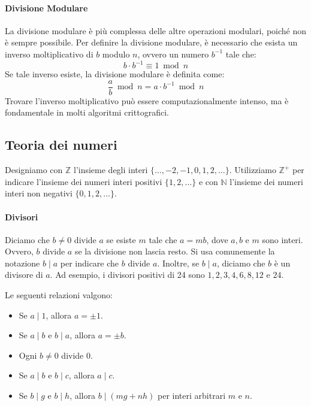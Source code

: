 \documentclass{article}
\theoremstyle{definition}
\begin{document}
\paragraph{Divisione Modulare}
La divisione modulare è più complessa delle altre operazioni modulari, poiché non è sempre possibile. Per definire la divisione modulare, è necessario che esista un inverso moltiplicativo di $b$ modulo $n$, ovvero un numero $b^{-1}$ tale che:
\begin{equation*}
    b \cdot b^{-1} \equiv 1 \bmod n
\end{equation*}
Se tale inverso esiste, la divisione modulare è definita come:
\begin{equation*}
    \frac{a}{b}  \bmod n = a \cdot b^{-1} \bmod n
\end{equation*}
Trovare l'inverso moltiplicativo può essere computazionalmente intenso, ma è fondamentale in molti algoritmi crittografici.

\subsection{Teoria dei numeri}
Designiamo con \( \mathbb{Z} \) l'insieme degli interi \( \{ \ldots, -2, -1, 0, 1, 2, \ldots \} \). Utilizziamo \( \mathbb{Z}^+ \) per indicare l'insieme dei numeri interi positivi \( \{ 1, 2, \ldots \} \) e con \( \mathbb{N} \) l'insieme dei numeri interi non negativi \( \{ 0, 1, 2, \ldots \} \).

\paragraph{Divisori}Diciamo che \( b \neq 0 \) divide \( a \) se esiste \( m \) tale che \( a = mb \), dove \( a, b \) e \( m \) sono interi. Ovvero, \( b \) divide \( a \) se la divisione non lascia resto. Si usa comunemente la notazione \( b \mid a \) per indicare che \( b \) divide \( a \). Inoltre, se \( b \mid a \), diciamo che \( b \) è un divisore di \( a \). Ad esempio, i divisori positivi di 24 sono \( 1, 2, 3, 4, 6, 8, 12 \) e \( 24 \).

Le seguenti relazioni valgono:
\begin{itemize}
\item Se \( a \mid 1 \), allora \( a = \pm 1 \).
\item Se \( a \mid b \) e \( b \mid a \), allora \( a = \pm b \).
\item Ogni \( b \neq 0 \) divide \( 0 \).
\item Se \( a \mid b \) e \( b \mid c \), allora \( a \mid c \).
\item Se \( b \mid g \) e \( b \mid h \), allora \( b \mid (mg + nh) \) per interi arbitrari \( m \) e \( n \).
\end{itemize}
\end{document}
